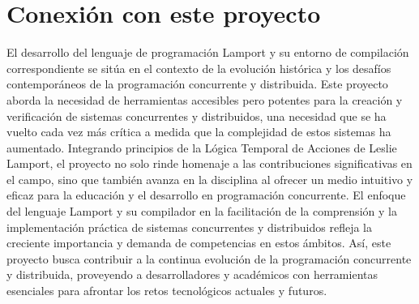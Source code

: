 \section{Conexión con este proyecto}
El desarrollo del lenguaje de programación Lamport y su entorno de compilación correspondiente se sitúa en el contexto de la evolución histórica y los desafíos contemporáneos de la programación concurrente y distribuida. Este proyecto aborda la necesidad de herramientas accesibles pero potentes para la creación y verificación de sistemas concurrentes y distribuidos, una necesidad que se ha vuelto cada vez más crítica a medida que la complejidad de estos sistemas ha aumentado. Integrando principios de la Lógica Temporal de Acciones de Leslie Lamport, el proyecto no solo rinde homenaje a las contribuciones significativas en el campo, sino que también avanza en la disciplina al ofrecer un medio intuitivo y eficaz para la educación y el desarrollo en programación concurrente. El enfoque del lenguaje Lamport y su compilador en la facilitación de la comprensión y la implementación práctica de sistemas concurrentes y distribuidos refleja la creciente importancia y demanda de competencias en estos ámbitos. Así, este proyecto busca contribuir a la continua evolución de la programación concurrente y distribuida, proveyendo a desarrolladores y académicos con herramientas esenciales para afrontar los retos tecnológicos actuales y futuros.